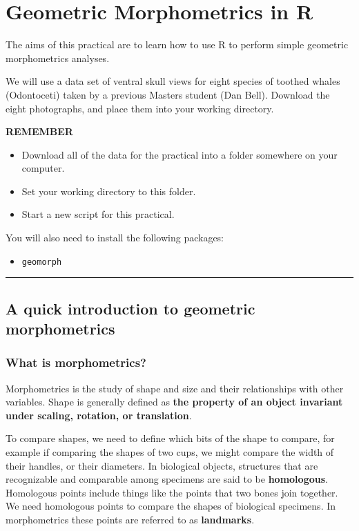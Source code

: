 \documentclass[]{book}
\providecommand{\tightlist}{%
  \setlength{\itemsep}{0pt}\setlength{\parskip}{0pt}}
\begin{document}
\chapter{Geometric Morphometrics in
R}\label{geometric-morphometrics-in-r}

The aims of this practical are to learn how to use R to perform simple
geometric morphometrics analyses.

We will use a data set of ventral skull views for eight species of
toothed whales (Odontoceti) taken by a previous Masters student (Dan
Bell). Download the eight photographs, and place them into your working
directory.

\textbf{REMEMBER}

\begin{itemize}
\tightlist
\item
  Download all of the data for the practical into a folder somewhere on
  your computer.
\item
  Set your working directory to this folder.
\item
  Start a new script for this practical.
\end{itemize}

You will also need to install the following packages:

\begin{itemize}
\tightlist
\item
  \texttt{geomorph}
\end{itemize}

\begin{center}\rule{0.5\linewidth}{\linethickness}\end{center}

\section{A quick introduction to geometric
morphometrics}\label{a-quick-introduction-to-geometric-morphometrics}

\subsection{What is morphometrics?}\label{what-is-morphometrics}

Morphometrics is the study of shape and size and their relationships
with other variables. Shape is generally defined as \textbf{the property
of an object invariant under scaling, rotation, or translation}.

To compare shapes, we need to define which bits of the shape to compare,
for example if comparing the shapes of two cups, we might compare the
width of their handles, or their diameters. In biological objects,
structures that are recognizable and comparable among specimens are said
to be \textbf{homologous}. Homologous points include things like the
points that two bones join together. We need homologous points to
compare the shapes of biological specimens. In morphometrics these
points are referred to as \textbf{landmarks}.
\end{document}
